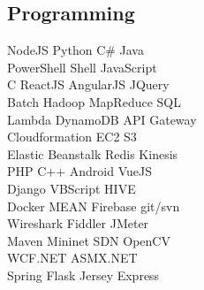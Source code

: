\documentclass[]{deedy-resume-openfont}
\begin{document}
\begin{minipage}[t]{0.33\textwidth}
\subsection{Programming}
NodeJS \textbullet{} Python \textbullet{} C\# \textbullet{} Java \\
PowerShell \textbullet{} Shell \textbullet{} JavaScript \\
C \textbullet{} ReactJS \textbullet{} AngularJS \textbullet{} JQuery \\
Batch \textbullet{} Hadoop MapReduce \textbullet{} SQL \\
Lambda \textbullet{} DynamoDB \textbullet{} API Gateway  \\
Cloudformation \textbullet{} EC2 \textbullet{} S3 \\
Elastic Beanstalk \textbullet{} Redis \textbullet{} Kinesis \\
PHP \textbullet{} C++ \textbullet{} Android \textbullet{} VueJS \\
Django \textbullet{} VBScript \textbullet{} HIVE \\
Docker \textbullet{} MEAN \textbullet{} Firebase \textbullet{} git/svn \\
Wireshark \textbullet{} Fiddler \textbullet{} JMeter \\
Maven \textbullet{} Mininet SDN \textbullet{} OpenCV \\
WCF.NET \textbullet{} ASMX.NET \\
Spring \textbullet{} Flask \textbullet{} Jersey \textbullet{} Express

\sectionsep

%
%

\end{minipage} 
\hfill
\end{document}
